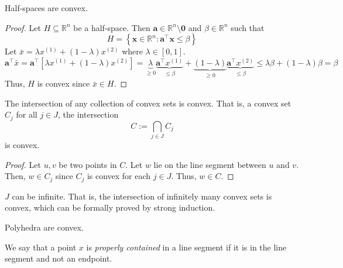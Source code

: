 \begin{thmbox}
    \begin{theorem}
        Half-spaces are convex.
    \end{theorem}
\end{thmbox}
\begin{proof}
    Let $ H\subseteq\mathbb{R}^n $ be a half-space. Then $ \bm{a} \in \mathbb{R}
        ^n\setminus{\bm{0}} $ and $ \beta\in\mathbb{R}^n $ such that
    \[ H=\left\{\bm{x}\in\mathbb{R}^n: \bm{a} ^\top \bm{x}\le\beta \right\} \]
    Let $ \bar{x}=\lambda x^{(1)} + (1-\lambda)x^{(2)} $ where $ \lambda\in[0,1] $.
    \[ \bm{a}^\top\bar{x}=\bm{a}^\top\left[\lambda x^{(1)} + (1-\lambda)x^{(2)}\right]=
        \underbrace{\lambda}_{\geqslant  0}\underbrace{\bm{a} ^\top x^{(1)}}_{\leqslant \beta}+
        \underbrace{(1-\lambda)}_{\geqslant  0}\underbrace{\bm{a} ^\top x^{(2)}}_{\leqslant \beta}
        \leqslant \lambda \beta + (1-\lambda)\beta=\beta \]
    Thus, $ H $ is convex since $ \bar{x}\in H $.
\end{proof}

\begin{thmbox}
    \begin{theorem}
        The intersection of any collection of convex sets is convex.
        That is, a convex set $ C_j $ for all $ j\in J $, the intersection
        \[ C:=\bigcap_{j\in J} C_j \]
        is convex.
    \end{theorem}
\end{thmbox}

\begin{proof}
    Let $ u,v $ be two points in $ C $. Let $ w $ lie on the line
    segment between $ u $ and $ v $. Then, $ w\in C_j $ since $ C_j $ is convex
    for each $ j\in J $. Thus, $ w\in C $.
\end{proof}

\begin{remark}
    $ J $ can be infinite. That is, the intersection of infinitely many convex sets
    is convex, which can be formally proved by strong induction.
\end{remark}

\begin{thmbox}
    \begin{theorem}
        Polyhedra are convex.
    \end{theorem}
\end{thmbox}

\begin{defbox}
    \begin{definition}
        We say that a point $x$ is \emph{properly contained} in a line segment if it is in the line segment
        and not an endpoint.
    \end{definition}
\end{defbox}

